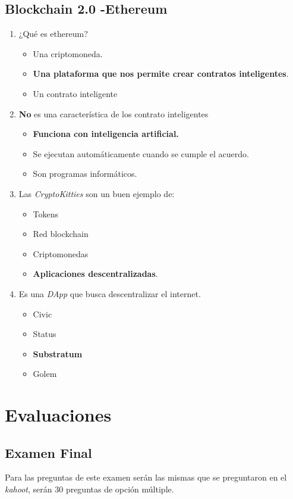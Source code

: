 \documentclass[a4paper,12pt]{lib/pub}
\begin{document}
\subsection{Blockchain 2.0 -Ethereum}
\begin{enumerate}
	\item ¿Qué es ethereum?
	\begin{itemize}
		\item Una criptomoneda.
		\item \textbf{Una plataforma que nos permite crear contratos inteligentes}.
		\item Un contrato inteligente
	\end{itemize}
	\item \textbf{No} es una característica de los contrato inteligentes
	\begin{itemize}
		\item \textbf{Funciona con inteligencia artificial.}
		\item  Se ejecutan automáticamente cuando se cumple el acuerdo.
		\item Son programas informáticos.
	\end{itemize}
	\item Las \textit{CryptoKitties} son un buen ejemplo de:
	\begin{itemize}
		\item Tokens
		\item Red blockchain
		\item Criptomonedas
		\item \textbf{Aplicaciones descentralizadas}.
	\end{itemize}
	\item Es una \textit{DApp} que busca descentralizar el internet.
	\begin{itemize}
		\item Civic
		\item Status
		\item \textbf{Substratum}
		\item Golem
	\end{itemize} 
\end{enumerate}
\section{Evaluaciones}
\subsection{Examen Final}
Para las preguntas de este examen serán las mismas que se preguntaron en el \textit{kahoot}, serán 30 preguntas de opción múltiple.
\end{document}
